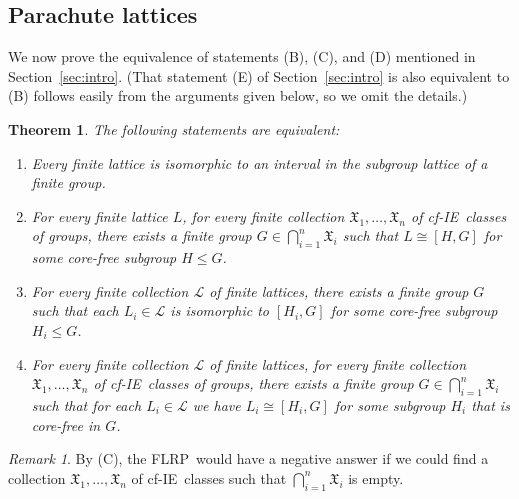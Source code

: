 \documentclass[11pt]{amsart}
\theoremstyle{plain}
\newtheorem{theorem}{Theorem}[section]
\theoremstyle{definition}
\theoremstyle{remark}
\newtheorem*{remark}{Remark}
\numberwithin{theorem}{section}
\numberwithin{claim}{section}
\numberwithin{equation}{section}
\numberwithin{conjecture}{section}
\newcommand{\<}{\ensuremath{\langle}}
\renewcommand{\>}{\ensuremath{\rangle}}
\renewcommand{\leq}{\ensuremath{\leqslant}}
\newcommand{\core}{\ensuremath{\operatorname{core}}}
\newcommand{\FLRP}{{\small FLRP}}
\newcommand{\0}{\ensuremath{\mathbf{0}}}
\newcommand{\1}{\ensuremath{\mathbf{1}}}
\newcommand{\2}{\ensuremath{\mathbf{2}}}
\newcommand{\3}{\ensuremath{\mathbf{3}}}
\newcommand{\4}{\ensuremath{\mathbf{4}}}
\newcommand{\5}{\ensuremath{\mathbf{5}}}
\newcommand{\sG}{\ensuremath{\mathfrak{X}}}
\newcommand{\sL}{\ensuremath{\mathscr{L}}}
\newcommand{\IE}{{\small IE}}
\begin{document}
\subsection{Parachute lattices}
\label{sec:parachute-lattices}
We now prove the equivalence of statements (B), (C), 
and (D) mentioned in Section~\ref{sec:intro}.  
(That statement (E) of Section~\ref{sec:intro} is also equivalent to (B) follows
easily from the arguments given below, so we omit the details.)
\begin{theorem}
\label{thm-wjd-1}
The following statements are equivalent:
\begin{enumerate}
\item[(B)] Every finite lattice is isomorphic to
  an interval in the subgroup lattice of a finite group.
\item[(C)]
For every finite lattice $L$, for every finite collection $\sG_1, \dots, \sG_n$
of cf-\IE\ classes of groups,
there exists a finite group $G \in \bigcap\limits_{i=1}^n \sG_i$ such that $L \cong
[H,G]$ for some core-free subgroup $H\leq G$. %

\item[(D)]
For every finite collection $\sL$ of finite lattices, there exists a finite
group $G$ such that each $L_i \in \sL$ is isomorphic to $[H_i, G]$ for some
core-free subgroup $H_i\leq G$.

\item[(E)]
For every finite collection $\sL$ of finite lattices, for every finite collection $\sG_1, \dots, \sG_n$
of cf-\IE\ classes of groups,
there exists a finite group $G \in \bigcap\limits_{i=1}^n \sG_i$ such that for
each $L_i \in \sL$ we have $L_i\cong [H_i, G]$ for some subgroup
$H_i$ that is core-free in $G$. %
\end{enumerate}
\end{theorem}
\begin{remark}
By (C), the \FLRP\ would have a negative answer if we
could find a collection $\sG_1, \dots, \sG_n$ of cf-\IE\ classes
such that $\bigcap\limits_{i=1}^n \sG_i$ is empty.
\end{remark}
\end{document}
